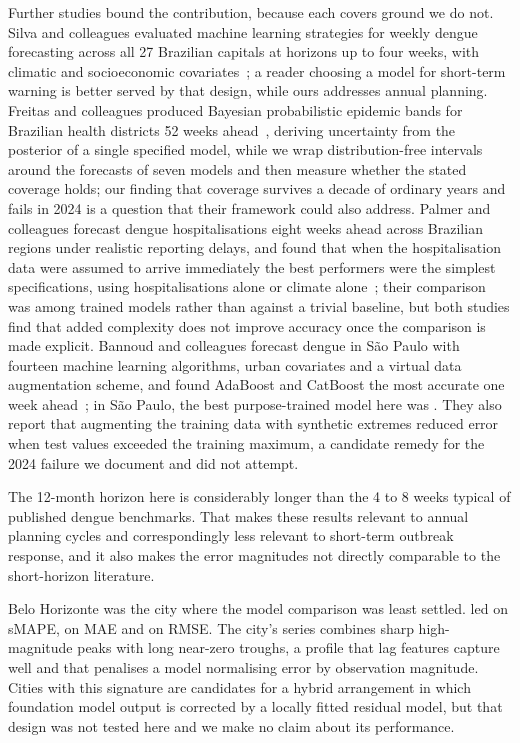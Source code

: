 \documentclass[10pt,letterpaper]{article}
\begin{document}
{Further studies bound the contribution, because each covers ground we do not. Silva and colleagues evaluated machine learning strategies for weekly dengue forecasting across all 27 Brazilian capitals at horizons up to four weeks, with climatic and socioeconomic covariates~\cite{Silva2026capitals}; a reader choosing a model for short-term warning is better served by that design, while ours addresses annual planning. Freitas and colleagues produced Bayesian probabilistic epidemic bands for Brazilian health districts 52 weeks ahead~\cite{Freitas2025bands}, deriving uncertainty from the posterior of a single specified model, while we wrap distribution-free intervals around the forecasts of seven models and then measure whether the stated coverage holds; our finding that coverage survives a decade of ordinary years and fails in 2024 is a question that their framework could also address. Palmer and colleagues forecast dengue hospitalisations eight weeks ahead across Brazilian regions under realistic reporting delays, and found that when the hospitalisation data were assumed to arrive immediately the best performers were the simplest specifications, using hospitalisations alone or climate alone~\cite{Palmer2026hosp}; their comparison was among trained models rather than against a trivial baseline, but both studies find that added complexity does not improve accuracy once the comparison is made explicit. Bannoud and colleagues forecast dengue in S\~ao Paulo with fourteen machine learning algorithms, urban covariates and a virtual data augmentation scheme, and found AdaBoost and CatBoost the most accurate one week ahead~\cite{Bannoud2026augment}; in S\~ao Paulo, the best purpose-trained model here was . They also report that augmenting the training data with synthetic extremes reduced error when test values exceeded the training maximum, a candidate remedy for the 2024 failure we document and did not attempt.

The 12-month horizon here is considerably longer than the 4 to 8 weeks typical of published dengue benchmarks. That makes these results relevant to annual planning cycles and correspondingly less relevant to short-term outbreak response, and it also makes the error magnitudes not directly comparable to the short-horizon literature.

Belo Horizonte was the city where the model comparison was least settled.  led on sMAPE,  on MAE and  on RMSE. The city's series combines sharp high-magnitude peaks with long near-zero troughs, a profile that lag features capture well and that penalises a model normalising error by observation magnitude. Cities with this signature are candidates for a hybrid arrangement in which foundation model output is corrected by a locally fitted residual model, but that design was not tested here and we make no claim about its performance.

}
\end{document}
